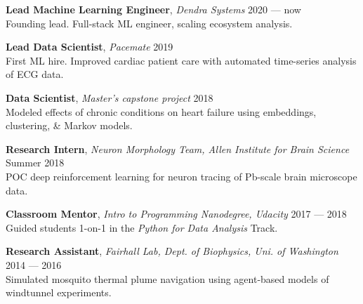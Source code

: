 \documentclass[a4paper,12pt]{article}
\newcommand{\resheading}[1]{{\vspace*{.001in} \colorbox{mygrey}{\begin{minipage}{\textwidth}{\textmd{\large \textbf{#1} \vphantom{p\^{E}}}}\end{minipage}}} }
\newcommand{\ressubheading}[4]{
    \textbf{#1} \hfill #2\\
    \textit{#3} \hfill #4 \\}
\begin{document}
    {\setlength{\parskip}{8pt}

    \textbf{Lead Machine Learning Engineer}, \textit{Dendra Systems} \hfill 2020 --- now \\
    Founding lead. Full-stack ML engineer, scaling ecosystem analysis.


    \textbf{Lead Data Scientist}, \textit{Pacemate} \hfill 2019 \\
    First ML hire. Improved cardiac patient care with automated time-series analysis of ECG data.

    \textbf{Data Scientist}, \textit{Master's capstone project} \hfill 2018\\
    Modeled effects of chronic conditions on heart failure using embeddings, clustering, \& Markov models.

    \textbf{Research Intern}, \textit{Neuron Morphology Team, Allen Institute for Brain Science} \hfill Summer 2018\\
    POC deep reinforcement learning for neuron tracing of Pb-scale brain microscope data.


    \textbf{Classroom Mentor}, \textit{Intro to Programming Nanodegree, Udacity} \hfill 2017 --- 2018\\
    Guided students 1-on-1 in the \textit{Python for Data Analysis} Track.

    \textbf{Research Assistant}, \textit{Fairhall Lab, Dept. of Biophysics, Uni. of Washington} \hfill 2014 --- 2016\\
    Simulated mosquito thermal plume navigation using agent-based models of windtunnel experiments.\\


    }
%
%
\end{document}
